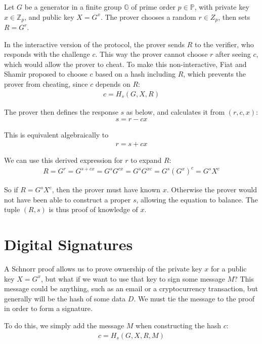 \documentclass{article}
\begin{document}
Let $G$ be a generator in a finite group $\mathbb{G}$ of prime order $p \in \mathbb{P}$, with private key $x \in \mathbb{Z}_p$, and public key $X = G^x$. The prover chooses a random $r \in Z_p$, then sets $R = G^r$.

In the interactive version of the protocol, the prover sends $R$ to the verifier, who responds with the challenge $c$.  This way the prover cannot choose $r$ after seeing $c$, which would allow the prover to cheat.  To make this non-interactive, Fiat and Shamir proposed to choose $c$ based on a hash including $R$, which prevents the prover from cheating, since $c$ depends on $R$:
\begin{align}
  c = H_s(G,X,R)
\end{align}

The prover then defines the response $s$ as below, and calculates it from $(r, c, x)$:
\begin{align}
  s = r - cx\nonumber
\end{align}
 
This is equivalent algebraically to
\begin{align}
  r = s + cx \nonumber
\end{align}

We can use this derived expression for $r$ to expand $R$:
\begin{align}
  R = G^r= G^{s + c x} = G^s G^{cx} = G^s G^{xc} = G^s (G^x)^c = G^s X^c
\end{align}

So if $R = G^s X^c$, then the prover must have known $x$.  Otherwise the prover would not have been able to construct a proper $s$, allowing the equation to balance.  The tuple $(R,s)$ is thus proof of knowledge of $x$.

\newpage
\section{Digital Signatures}
A Schnorr proof allows us to prove ownership of the private key $x$ for a public key $X = G^x$, but what if we want to use that key to sign some message $M$?  This message could be anything, such as an email or a cryptocurrency transaction, but generally will be the hash of some data $D$.  We must tie the message to the proof in order to form a signature.

To do this, we simply add the message $M$ when constructing the hash $c$:
\begin{align}
  c = H_s(G, X, R, M)
\end{align}
\end{document}
